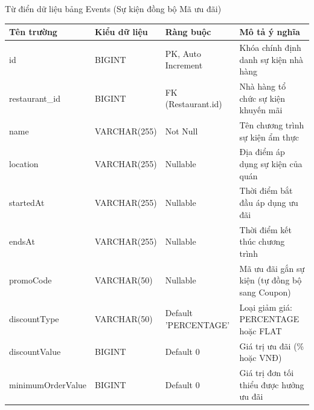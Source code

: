 \documentclass{uetgraduation}
\begin{document}
\begin{table}[!htbp]{Từ điển dữ liệu bảng Events (Sự kiện đồng bộ Mã ưu đãi)}
\centering
\small
\begin{tabularx}{\textwidth}{|>{\raggedright\arraybackslash}p{2.8cm}|>{\raggedright\arraybackslash}p{3.0cm}|>{\raggedright\arraybackslash}p{3.5cm}|>{\raggedright\arraybackslash}X|}
\hline
\textbf{Tên trường} & \textbf{Kiểu dữ liệu} & \textbf{Ràng buộc} & \textbf{Mô tả ý nghĩa} \\ \hline
id & BIGINT & PK, Auto Increment & Khóa chính định danh sự kiện nhà hàng \\ \hline
restaurant\_id & BIGINT & FK (Restaurant.id) & Nhà hàng tổ chức sự kiện khuyến mãi \\ \hline
name & VARCHAR(255) & Not Null & Tên chương trình sự kiện ẩm thực \\ \hline
location & VARCHAR(255) & Nullable & Địa điểm áp dụng sự kiện của quán \\ \hline
startedAt & VARCHAR(255) & Nullable & Thời điểm bắt đầu áp dụng ưu đãi \\ \hline
endsAt & VARCHAR(255) & Nullable & Thời điểm kết thúc chương trình \\ \hline
promoCode & VARCHAR(50) & Nullable & Mã ưu đãi gắn sự kiện (tự đồng bộ sang Coupon) \\ \hline
discountType & VARCHAR(50) & Default 'PERCENTAGE' & Loại giảm giá: PERCENTAGE hoặc FLAT \\ \hline
discountValue & BIGINT & Default 0 & Giá trị ưu đãi (\% hoặc VNĐ) \\ \hline
minimumOrderValue & BIGINT & Default 0 & Giá trị đơn tối thiểu được hưởng ưu đãi \\ \hline
\end{tabularx}
\end{table}
\clearpage
\end{document}
